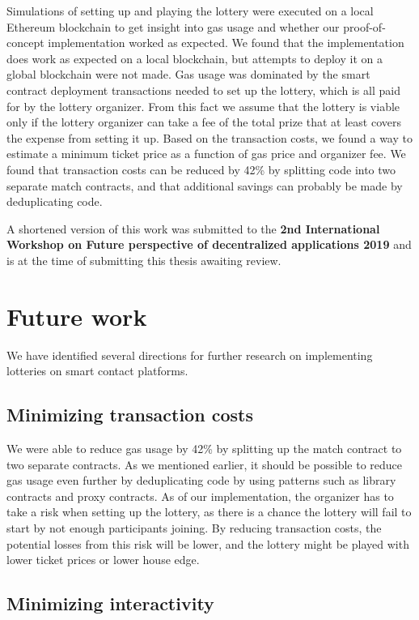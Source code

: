 Simulations of setting up and playing the lottery were executed on a local Ethereum blockchain to get insight into gas usage and whether our proof-of-concept implementation worked as expected. We found that the implementation does work as expected on a local blockchain, but attempts to deploy it on a global blockchain were not made. Gas usage was dominated by the smart contract deployment transactions needed to set up the lottery, which is all paid for by the lottery organizer. From this fact we assume that the lottery is viable only if the lottery organizer can take a fee of the total prize that at least covers the expense from setting it up. Based on the transaction costs, we found a way to estimate a minimum ticket price as a function of gas price and organizer fee. We found that transaction costs can be reduced by 42\% by splitting code into two separate match contracts, and that additional savings can probably be made by deduplicating code.

A shortened version of this work was submitted to the \textbf{2nd International Workshop on Future perspective of decentralized applications 2019} and is at the time of submitting this thesis awaiting review.

\section{Future work}
\label{sec:future-work}

We have identified several directions for further research on implementing lotteries on smart contact platforms.

\subsection{Minimizing transaction costs}

We were able to reduce gas usage by 42\% by splitting up the match contract to two separate contracts. As we mentioned earlier, it should be possible to reduce gas usage even further by deduplicating code by using patterns such as library contracts and proxy contracts. As of our implementation, the organizer has to take a risk when setting up the lottery, as there is a chance the lottery will fail to start by not enough participants joining. By reducing transaction costs, the potential losses from this risk will be lower, and the lottery might be played with lower ticket prices or lower house edge.

\subsection{Minimizing interactivity}

